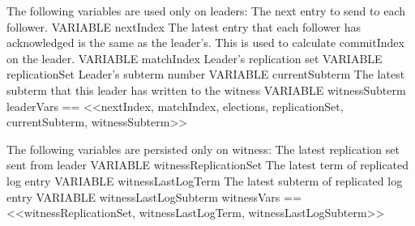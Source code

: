 \documentclass{standalone}
\begin{document}
\onehalfspacing

    \begin{tla}

\* The following variables are used only on leaders:
\* The next entry to send to each follower.
VARIABLE nextIndex
\* The latest entry that each follower has acknowledged is the same as the
\* leader's. This is used to calculate commitIndex on the leader.
VARIABLE matchIndex
\* Leader's replication set
VARIABLE replicationSet
\* Leader's subterm number
VARIABLE currentSubterm
\* The latest subterm that this leader has written to the witness
VARIABLE witnessSubterm
leaderVars == <<nextIndex, matchIndex, elections, 
                replicationSet, currentSubterm, witnessSubterm>>

\* The following variables are persisted only on witness:
\* The latest replication set sent from leader
VARIABLE witnessReplicationSet
\* The latest term of replicated log entry
VARIABLE witnessLastLogTerm
\* The latest subterm of replicated log entry
VARIABLE witnessLastLogSubterm
witnessVars == <<witnessReplicationSet, 
                 witnessLastLogTerm, witnessLastLogSubterm>>

    \end{tla}
\begin{tlatex}
\@x{}%
%
\@xx{}%
\@x{}%
%
\@xx{}%
%
\@x{}%
%
\@xx{}%
\@x{}%
%
\@xx{}%
%
\@x{}%
%
\@xx{}%
%
\@x{}%
%
\@xx{}%
%
\@x{}%
%
\@xx{}%
%
\@pvspace{8.0pt}%
\@x{}%
%
\@xx{}%
\@x{}%
%
\@xx{}%
%
\@x{}%
%
\@xx{}%
%
\@x{}%
%
\@xx{}%
%
%
%
\@pvspace{8.0pt}%
\end{tlatex}
\end{document}
